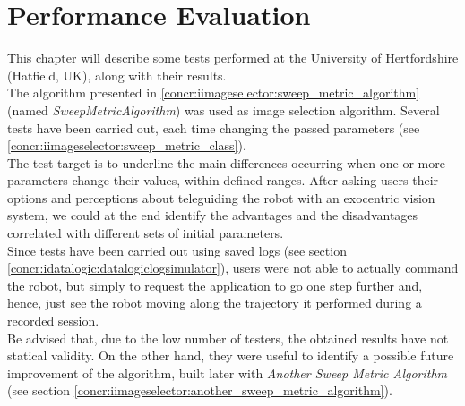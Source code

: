 \setcounter{figure}{0}
\setcounter{table}{0}
\setcounter{lstlisting}{0}

\chapter{Performance Evaluation}
\label{sec:performance_evaluation}
\minitoc

This chapter will describe some tests performed at the 
University of Hertfordshire (Hatfield, UK), along with 
their results. 
\\
The algorithm presented in \ref{concr:iimageselector:sweep_metric_algorithm}
(named \textit{SweepMetricAlgorithm}) was used as image
selection algorithm. Several tests 
have been carried out, each time changing the passed parameters
(see \ref{concr:iimageselector:sweep_metric_class}).
\\
The test target is to underline the main differences 
occurring when one or more parameters change their values, 
within defined ranges. After asking users their options 
and perceptions about teleguiding the robot with an 
exocentric vision system, we could at the end identify 
the advantages and the disadvantages correlated with 
different sets of initial parameters.
\\
Since tests have been carried out using saved logs 
(see section \ref{concr:idatalogic:datalogiclogsimulator}),
users were not 
able to actually command the robot, but simply 
to request the application to go one step
further and, hence, just see the robot moving along 
the trajectory it performed during a recorded 
session.
\\
Be advised that, due to the low number of testers, 
the obtained results have not statical validity.
On the other hand, they were useful to identify 
a possible future improvement of the algorithm,
built later with \textit{Another Sweep Metric Algorithm} 
(see section \ref{concr:iimageselector:another_sweep_metric_algorithm}).


\clearpage

\clearpage

\clearpage

